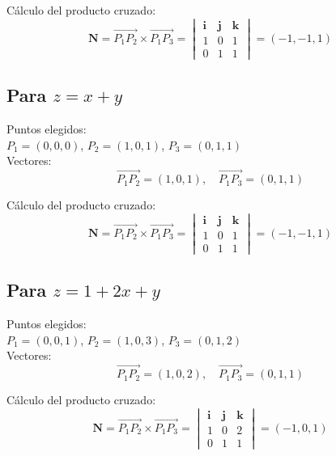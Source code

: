 \documentclass{article}
\begin{document}
Cálculo del producto cruzado:
\begin{equation*}
    \mathbf{N} = \overrightarrow{P_1P_2} \times \overrightarrow{P_1P_3} =
    \begin{vmatrix} 
    \mathbf{i} & \mathbf{j} & \mathbf{k} \\
    1 & 0 & 1 \\
    0 & 1 & 1
    \end{vmatrix} = (-1, -1, 1)
\end{equation*}

\subsection{Para $z = x + y$}
Puntos elegidos: \\ 
$P_1 = (0,0,0)$, $P_2 = (1,0,1)$, $P_3 = (0,1,1)$ \\  
Vectores:
\begin{equation*}
    \overrightarrow{P_1P_2} = (1,0,1), \quad \overrightarrow{P_1P_3} = (0,1,1)
\end{equation*}

Cálculo del producto cruzado:
\begin{equation*}
    \mathbf{N} = \overrightarrow{P_1P_2} \times \overrightarrow{P_1P_3} =
    \begin{vmatrix} 
    \mathbf{i} & \mathbf{j} & \mathbf{k} \\
    1 & 0 & 1 \\
    0 & 1 & 1
    \end{vmatrix} = (-1, -1, 1)
\end{equation*}

\subsection{Para $z = 1 + 2x + y$}
Puntos elegidos: \\ 
$P_1 = (0,0,1)$, $P_2 = (1,0,3)$, $P_3 = (0,1,2)$ \\  
Vectores:
\begin{equation*}
    \overrightarrow{P_1P_2} = (1,0,2), \quad \overrightarrow{P_1P_3} = (0,1,1)
\end{equation*}

Cálculo del producto cruzado:
\begin{equation*}
    \mathbf{N} = \overrightarrow{P_1P_2} \times \overrightarrow{P_1P_3} =
    \begin{vmatrix} 
    \mathbf{i} & \mathbf{j} & \mathbf{k} \\
    1 & 0 & 2 \\
    0 & 1 & 1
    \end{vmatrix} = (-1, 0, 1)
\end{equation*}
\end{document}
